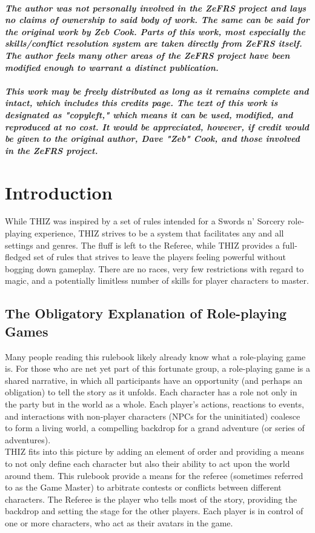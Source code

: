 \documentclass[oneside]{book}
\begin{document}
\paragraph{The author was not personally involved in the ZeFRS project and lays no claims of ownership to said body of work. The same can be said for the original work by Zeb Cook. Parts of this work, most especially the skills/conflict resolution system are taken directly from ZeFRS itself. The author feels many other areas of the ZeFRS project have been modified enough to warrant a distinct publication. \\ \\
This work may be freely distributed as long as it remains complete and intact, which includes this credits page. The text of this work is designated as "copyleft," which means it can be used, modified, and reproduced at no cost. It would be appreciated, however, if credit would be given to the original author, Dave "Zeb" Cook, and those involved in the ZeFRS project.}

\tableofcontents

\chapter{Introduction}

While THIZ was inspired by a set of rules intended for a Swords n' Sorcery role-playing experience, THIZ strives to be a system that facilitates any and all settings and genres. The fluff is left to the Referee, while THIZ provides a full-fledged set of rules that strives to leave the players feeling powerful without bogging down gameplay. There are no races, very few restrictions with regard to magic, and a potentially limitless number of skills for player characters to master. 

\section*{The Obligatory Explanation of Role-playing Games}

Many people reading this rulebook likely already know what a role-playing game is. For those who are net yet part of this fortunate group, a role-playing game is a shared narrative, in which all participants have an opportunity (and perhaps an obligation) to tell the story as it unfolds. Each character has a role not only in the party but in 
the world as a whole. Each player's actions, reactions to events, and interactions with non-player characters (NPCs for the uninitiated) coalesce to form a living world, a compelling backdrop for a grand adventure (or series of adventures). \\
THIZ fits into this picture by adding an element of order and providing a means to not only define each character but also their ability to act upon the world around them. This rulebook provide a means for the referee (sometimes referred to as the Game Master) to arbitrate contests or conflicts between different characters. The Referee is the player who tells most of the story, providing the backdrop and setting the stage for the other players. Each player is in control of one or more characters, who act as their avatars in the game. 
\end{document}
